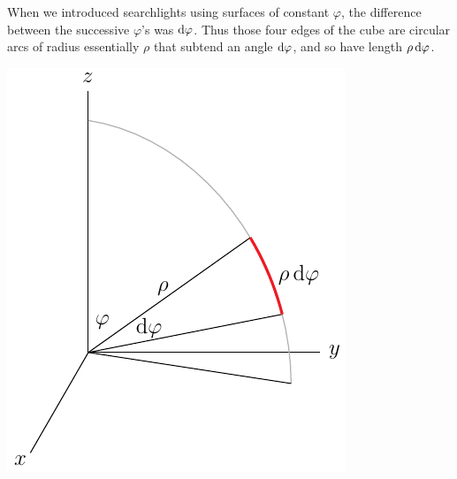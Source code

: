 \begin{itemize}
\begin{efig}
\begin{center}
\end{center}
\end{efig}
When we introduced searchlights using surfaces of constant $\varphi$, 
the difference between the successive $\varphi$'s was $\mathrm{d}\varphi$. 
Thus those four edges of the cube are circular arcs of radius 
essentially $\rho$ that subtend an angle $\mathrm{d}\varphi$, and so have length $\rho\,\mathrm{d}\varphi$.
\begin{efig}
\begin{center}
    \includegraphics[scale=0.8]{../figs_coord/spher9.pdf}
\end{center}
\end{efig}


\end{itemize}
